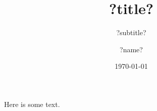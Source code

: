 \documentclass{beamer}
\title{?title?}
\subtitle{?subtitle?}
\author{?name?}
\institute{Valparaiso University}
\date{\today}
\begin{document}
\begin{frame}
	\titlepage
\end{frame}

\begin{frame}

Here is some text.

\end{frame}
\end{document}
